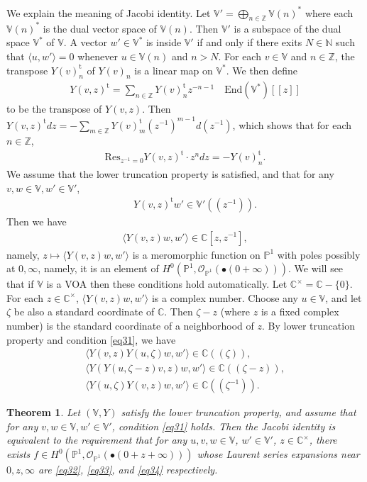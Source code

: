 \documentclass[12pt,b5paper,notitlepage]{report}
\theoremstyle{definition}
\theoremstyle{plain}
\newtheorem{thm}[df]{Theorem}
\newcommand{\tr}{\mathrm{t}} %
\newcommand{\End}{\mathrm{End}} %
\newcommand{\Res}{\mathrm{Res}}
\newcommand{\bk}[1]{\langle {#1}\rangle}
\newcommand{\scr}{\mathscr}
\newcommand{\mbb}{\mathbb}
\newcommand{\blt}{\bullet}
\newcommand{\Vbb}{\mathbb V}
\numberwithin{equation}{section}
\begin{document}
We explain the meaning of Jacobi identity. Let $\Vbb'=\bigoplus_{n\in\mbb Z}\Vbb(n)^*$ where each $\Vbb(n)^*$ is the dual vector space of $\Vbb(n)$. \index{V@$\Vbb',\Vbb^*$} Then $\Vbb'$ is a subspace of the dual space $\Vbb^*$ of $\Vbb$. A vector $w'\in\Vbb^*$ is inside $\Vbb'$ if and only if there exits $N\in\mbb N$ such that  $\bk{u,w'}=0$ whenever $u\in\Vbb(n)$ and $n>N$. For each $v\in\Vbb$ and $n\in\mbb Z$, the transpose $Y(v)_n^\tr$ of $Y(v)_n$ is a linear map on $\Vbb^*$. We then define
\begin{align*}
Y(v,z)^\tr=\sum_{n\in\mbb Z}Y(v)_n^\tr z^{-n-1}\quad\End(\Vbb^*)[[z]]
\end{align*}
to be the transpose of $Y(v,z)$. Then $Y(v,z)^\tr dz=-\sum_{m\in\mbb Z}Y(v)_m^\tr (z^{-1})^{m-1}d(z^{-1})$, which shows that for each $n\in\mbb Z$,
\begin{align}
\Res_{z^{-1}=0}Y(v,z)^\tr\cdot z^n dz=-Y(v)_n^\tr.\label{eq37}
\end{align}
We assume that the lower truncation property is satisfied, and that for any $v,w\in \Vbb,w'\in\Vbb'$,
\begin{gather}
\qquad Y(v,z)^\tr w'\in\Vbb'((z^{-1})).\label{eq31}
\end{gather}
Then we have
\begin{align*}
\bk{Y(v,z)w,w'}\in\mbb C[z,z^{-1}],
\end{align*}
namely, $z\mapsto \bk{Y(v,z)w,w'}$ is a meromorphic function on $\mbb P^1$ with poles possibly at $0,\infty$, namely, it is an element of $H^0(\mbb P^1,\scr O_{\mbb P^1}(\blt(0+\infty)))$. We will see that if $\Vbb$ is a VOA then these conditions hold automatically. Let $\mbb C^\times=\mbb C-\{0\}$. \index{C@$\mbb C^\times$} For each $z\in\mbb C^\times$, $\bk{Y(v,z)w,w'}$ is a complex number. Choose any $u\in\Vbb$, and let $\zeta$ be also a standard coordinate of $\mbb C$. Then $\zeta-z$ (where $z$ is a fixed complex number) is the standard coordinate of a neighborhood of $z$. By lower truncation property and condition \eqref{eq31}, we have
\begin{gather}
\bk{Y(v,z)Y(u,\zeta)w,w'}\in\mbb C((\zeta)),\label{eq32}\\
\bk{Y(Y(u,\zeta-z)v,z)w,w'}\in\mbb C((\zeta-z)),\label{eq33}\\
\bk{Y(u,\zeta)Y(v,z)w,w'}\in\mbb C((\zeta^{-1})).\label{eq34}
\end{gather}



\begin{thm}\label{lb19}
Let $(\Vbb,Y)$ satisfy the lower truncation property, and assume that for any $v,w\in\Vbb,w'\in\Vbb'$, condition \eqref{eq31} holds. Then the Jacobi identity is equivalent to the requirement that for any $u,v,w\in\Vbb$, $w'\in\Vbb'$, $z\in\mbb C^\times$, there exists $f\in H^0(\mbb P^1,\scr O_{\mbb P^1}(\blt (0+z+\infty)))$ whose Laurent series expansions near $0,z,\infty$ are \eqref{eq32}, \eqref{eq33}, and \eqref{eq34} respectively. 
\end{thm}
\end{document}

